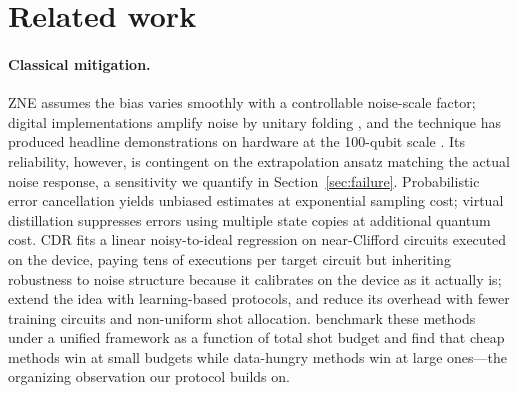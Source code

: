 \documentclass[11pt]{article}
\begin{document}
\section{Related work}
\label{sec:related}

\paragraph{Classical mitigation.}
ZNE \citep{temme2017error,li2017efficient} assumes the bias varies smoothly with a controllable noise-scale factor; digital implementations amplify noise by unitary folding \citep{giurgicatiron2020digital}, and the technique has produced headline demonstrations on hardware at the 100-qubit scale \citep{kim2023evidence}. Its reliability, however, is contingent on the extrapolation ansatz matching the actual noise response, a sensitivity we quantify in Section~\ref{sec:failure}. Probabilistic error cancellation \citep{temme2017error,van2023probabilistic} yields unbiased estimates at exponential sampling cost; virtual distillation \citep{huggins2021virtual,koczor2021exponential} suppresses errors using multiple state copies at additional quantum cost. CDR \citep{czarnik2021error} fits a linear noisy-to-ideal regression on near-Clifford circuits executed on the device, paying tens of executions per target circuit but inheriting robustness to noise structure because it calibrates on the device as it actually is; \citet{strikis2021learning} extend the idea with learning-based protocols, and \citet{czarnik2025improving} reduce its overhead with fewer training circuits and non-uniform shot allocation. \citet{bultrini2023unifying} benchmark these methods under a unified framework as a function of total shot budget and find that cheap methods win at small budgets while data-hungry methods win at large ones---the organizing observation our protocol builds on.
\end{document}
